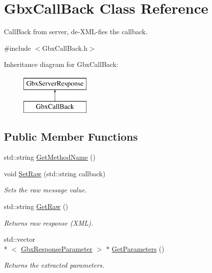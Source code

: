 \hypertarget{classGbxCallBack}{\section{Gbx\-Call\-Back Class Reference}
\label{classGbxCallBack}
}


Call\-Back from server, de-\/\-X\-M\-L-\/fies the callback.  




{\ttfamily \#include $<$Gbx\-Call\-Back.\-h$>$}

Inheritance diagram for Gbx\-Call\-Back\-:\begin{figure}[H]
\begin{center}
\leavevmode
\includegraphics[height=2.000000cm]{classGbxCallBack}
\end{center}
\end{figure}
\subsection*{Public Member Functions}
\begin{DoxyCompactItemize}
\item 
std\-::string \hyperlink{classGbxCallBack_aaf01544527ca0559478221780b3f32f6}{Get\-Method\-Name} ()
\item 
void \hyperlink{classGbxCallBack_a9382de8d43cae9e7a9acd384146c2900}{Set\-Raw} (std\-::string callback)
\begin{DoxyCompactList}\small\item\em Sets the raw message value. \end{DoxyCompactList}\item 
std\-::string \hyperlink{classGbxServerResponse_aa449d9a63899e1d1205e6ab916798ba6}{Get\-Raw} ()
\begin{DoxyCompactList}\small\item\em Returns raw response (X\-M\-L). \end{DoxyCompactList}\item 
std\-::vector\\*
$<$ \hyperlink{classGbxResponseParameter}{Gbx\-Response\-Parameter} $>$ $\ast$ \hyperlink{classGbxServerResponse_ab791b8d9edb964b909d3c70753549668}{Get\-Parameters} ()
\begin{DoxyCompactList}\small\item\em Returns the extracted parameters. \end{DoxyCompactList}\end{DoxyCompactItemize}

